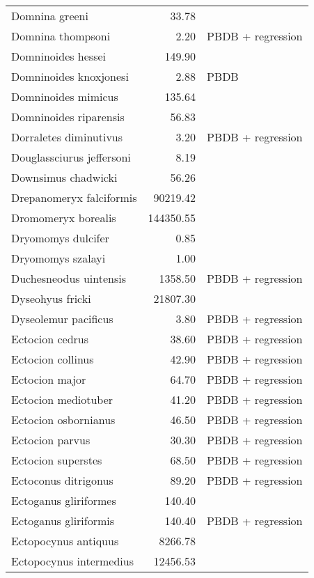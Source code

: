 \begin{table}[ht]
\begin{tabular}{lrl}
  Domnina greeni & 33.78 & \cite{Tomiya2013} \\ 
  Domnina thompsoni & 2.20 & PBDB + regression \\ 
  Domninoides hessei & 149.90 & \cite{Tomiya2013} \\ 
  Domninoides knoxjonesi & 2.88 & PBDB \\ 
  Domninoides mimicus & 135.64 & \cite{Tomiya2013} \\ 
  Domninoides riparensis & 56.83 & \cite{Tomiya2013} \\ 
  Dorraletes diminutivus & 3.20 & PBDB + regression \\ 
  Douglassciurus jeffersoni & 8.19 & \cite{Mihlbacher2006} \\ 
  Downsimus chadwicki & 56.26 & \cite{Tomiya2013} \\ 
  Drepanomeryx falciformis & 90219.42 & \cite{Tomiya2013} \\ 
  Dromomeryx borealis & 144350.55 & \cite{Tomiya2013} \\ 
  Dryomomys dulcifer & 0.85 & \cite{Novacek1977} \\ 
  Dryomomys szalayi & 1.00 & \cite{Novacek1977} \\ 
  Duchesneodus uintensis & 1358.50 & PBDB + regression \\ 
  Dyseohyus fricki & 21807.30 & \cite{Tomiya2013} \\ 
  Dyseolemur pacificus & 3.80 & PBDB + regression \\ 
  Ectocion cedrus & 38.60 & PBDB + regression \\ 
  Ectocion collinus & 42.90 & PBDB + regression \\ 
  Ectocion major & 64.70 & PBDB + regression \\ 
  Ectocion mediotuber & 41.20 & PBDB + regression \\ 
  Ectocion osbornianus & 46.50 & PBDB + regression \\ 
  Ectocion parvus & 30.30 & PBDB + regression \\ 
  Ectocion superstes & 68.50 & PBDB + regression \\ 
  Ectoconus ditrigonus & 89.20 & PBDB + regression \\ 
  Ectoganus gliriformes & 140.40 & \cite{Novacek1977} \\ 
  Ectoganus gliriformis & 140.40 & PBDB + regression \\ 
  Ectopocynus antiquus & 8266.78 & \cite{Tomiya2013} \\ 
  Ectopocynus intermedius & 12456.53 & \cite{Tomiya2013} \\ 

\end{tabular}
\end{table}

